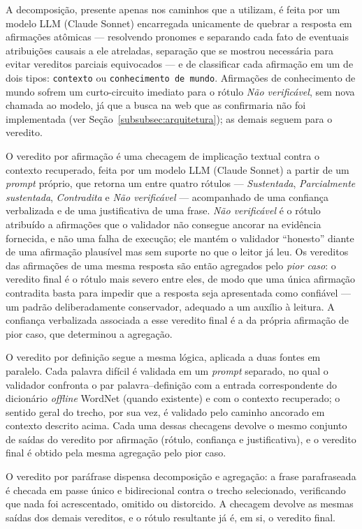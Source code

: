 A decomposição, presente apenas nos caminhos que a utilizam, é feita por um modelo LLM (Claude Sonnet) encarregada unicamente de quebrar a resposta em afirmações atômicas --- resolvendo pronomes e separando cada fato de eventuais atribuições causais a ele atreladas, separação que se mostrou necessária para evitar vereditos parciais equivocados --- e de classificar cada afirmação em um de dois tipos: \texttt{contexto} ou \texttt{conhecimento de mundo}. Afirmações de conhecimento de mundo sofrem um curto-circuito imediato para o rótulo \textit{Não verificável}, sem nova chamada ao modelo, já que a busca na web que as confirmaria não foi implementada (ver Seção~\ref{subsubsec:arquitetura}); as demais seguem para o veredito.

O veredito por afirmação é uma checagem de implicação textual contra o contexto recuperado, feita por um modelo LLM (Claude Sonnet) a partir de um \textit{prompt} próprio, que retorna um entre quatro rótulos --- \textit{Sustentada}, \textit{Parcialmente sustentada}, \textit{Contradita} e \textit{Não verificável} --- acompanhado de uma confiança verbalizada e de uma justificativa de uma frase. \textit{Não verificável} é o rótulo atribuído a afirmações que o validador não consegue ancorar na evidência fornecida, e não uma falha de execução; ele mantém o validador ``honesto'' diante de uma afirmação plausível mas sem suporte no que o leitor já leu. Os vereditos das afirmações de uma mesma resposta são então agregados pelo \textit{pior caso}: o veredito final é o rótulo mais severo entre eles, de modo que uma única afirmação contradita basta para impedir que a resposta seja apresentada como confiável --- um padrão deliberadamente conservador, adequado a um auxílio à leitura. A confiança verbalizada associada a esse veredito final é a da própria afirmação de pior caso, que determinou a agregação.

O veredito por definição segue a mesma lógica, aplicada a duas fontes em paralelo. Cada palavra difícil é validada em um \textit{prompt} separado, no qual o validador confronta o par palavra--definição com a entrada correspondente do dicionário \textit{offline} WordNet (quando existente) e com o contexto recuperado; o sentido geral do trecho, por sua vez, é validado pelo caminho ancorado em contexto descrito acima. Cada uma dessas checagens devolve o mesmo conjunto de saídas do veredito por afirmação (rótulo, confiança e justificativa), e o veredito final é obtido pela mesma agregação pelo pior caso.

O veredito por paráfrase dispensa decomposição e agregação: a frase parafraseada é checada em passe único e bidirecional contra o trecho selecionado, verificando que nada foi acrescentado, omitido ou distorcido. A checagem devolve as mesmas saídas dos demais vereditos, e o rótulo resultante já é, em si, o veredito final.

